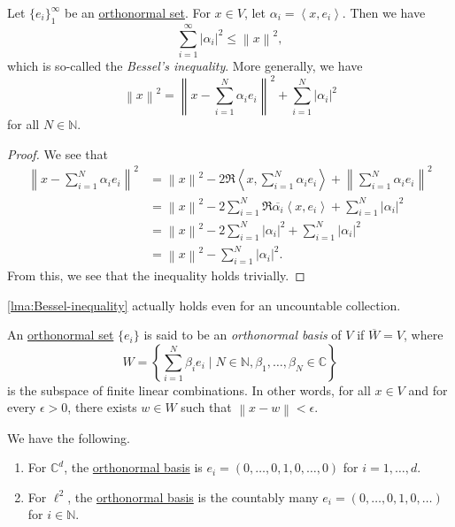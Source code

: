 \begin{lemma}\label{lma:Bessel-inequality}
	Let \(\{e_i\}_1^\infty\) be an \hyperref[def:orthonormal-set]{orthonormal set}. For \(x \in V\), let \(\alpha_i = \left< x,e_i \right>\). Then we have
	\[
		\sum\limits_{i=1}^\infty \left\vert \alpha_i \right\vert^2 \leq \left\lVert x\right\rVert^2,
	\]
	which is so-called the \emph{Bessel's inequality}. More generally, we have
	\[
		\left\lVert x\right\rVert^2 = \left\lVert x - \sum\limits_{i=1}^N \alpha_i e_i\right\rVert ^2 + \sum\limits_{i=1}^N \left\vert \alpha_i \right\vert ^2
	\]
	for all \(N \in \mathbb{N}\).
\end{lemma}
\begin{proof}
	We see that
	\[
		\begin{split}
			\left\lVert x - \sum_{i=1}^N \alpha_ie_i\right\rVert^2
			&= \left\lVert x\right\rVert^2 - 2\Re \left< x, \sum_{i=1}^N \alpha_i e_i\right> + \left\lVert \sum_{i=1}^N \alpha_i e_i\right\rVert ^2 \\
			&= \left\lVert x\right\rVert^2 - 2\sum_{i=1}^N \Re \overline{\alpha_i}\left< x,e_i \right> + \sum_{i=1}^N \left\vert \alpha_i \right\vert ^2 \\
			&= \left\lVert x\right\rVert^2 - 2\sum_{i=1}^N \left\vert \alpha_i \right\vert ^2 + \sum_{i=1}^N \left\vert \alpha_i \right\vert ^2 \\
			&= \left\lVert x\right\rVert^2 - \sum_{i=1}^N \left\vert \alpha_i \right\vert ^2.
		\end{split}
	\]
	From this, we see that the inequality holds trivially.
\end{proof}
\begin{remark}
	\autoref{lma:Bessel-inequality} actually holds even for an uncountable collection.
\end{remark}

\begin{definition}\label{def:orthonormal-basis}
	An \hyperref[def:orthonormal-set]{orthonormal set} \(\{e_i\}\) is said to be an \emph{orthonormal basis} of \(V\) if \(\overline{W} = V\), where
	\[
		W = \left\{\sum_{i=1}^N \beta_i e_i \mid N \in \mathbb{N}, \beta_1,\dots,\beta_N \in \mathbb{C}\right\}
	\]
	is the subspace of finite linear combinations. In other words, for all \(x \in V\) and for every \(\epsilon > 0\), there exists \(w \in W\) such that \(\left\lVert x - w\right\rVert  < \epsilon \).
\end{definition}

\begin{eg}
	We have the following.
	\begin{enumerate}[(1)]
		\item For \(\mathbb{C}^d\), the \hyperref[def:orthonormal-basis]{orthonormal basis} is \(e_i = (0,\dots,0,1,0,\dots,0)\) for \(i = 1,\dots,d\).
		\item For \(\ell^2\), the \hyperref[def:orthonormal-basis]{orthonormal basis} is the countably many \(e_i = (0,\dots,0,1,0,\dots)\) for \(i \in \mathbb{N}\).
	\end{enumerate}
\end{eg}

